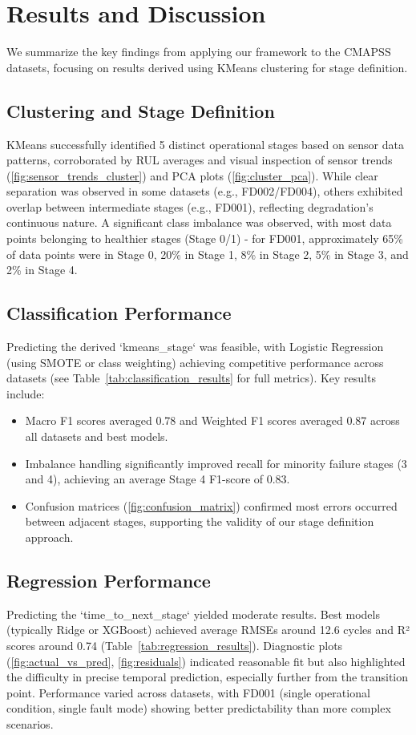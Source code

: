\section{Results and Discussion}
\label{sec:results}
We summarize the key findings from applying our framework to the CMAPSS datasets, focusing on results derived using KMeans clustering for stage definition.

\subsection{Clustering and Stage Definition}
KMeans successfully identified 5 distinct operational stages based on sensor data patterns, corroborated by RUL averages and visual inspection of sensor trends (\cref{fig:sensor_trends_cluster}) and PCA plots (\cref{fig:cluster_pca}). While clear separation was observed in some datasets (e.g., FD002/FD004), others exhibited overlap between intermediate stages (e.g., FD001), reflecting degradation's continuous nature. A significant class imbalance was observed, with most data points belonging to healthier stages (Stage 0/1) - for FD001, approximately 65\% of data points were in Stage 0, 20\% in Stage 1, 8\% in Stage 2, 5\% in Stage 3, and 2\% in Stage 4.

\subsection{Classification Performance}
Predicting the derived `kmeans\_stage` was feasible, with Logistic Regression (using SMOTE or class weighting) achieving competitive performance across datasets (see Table~\ref{tab:classification_results} for full metrics). Key results include:
\begin{itemize}
	\item Macro F1 scores averaged 0.78 and Weighted F1 scores averaged 0.87 across all datasets and best models.
	\item Imbalance handling significantly improved recall for minority failure stages (3 and 4), achieving an average Stage 4 F1-score of 0.83.
	\item Confusion matrices (\cref{fig:confusion_matrix}) confirmed most errors occurred between adjacent stages, supporting the validity of our stage definition approach.
\end{itemize}

\subsection{Regression Performance}
Predicting the `time\_to\_next\_stage` yielded moderate results. Best models (typically Ridge or XGBoost) achieved average RMSEs around 12.6 cycles and R² scores around 0.74 (Table~\ref{tab:regression_results}). Diagnostic plots (\cref{fig:actual_vs_pred}, \cref{fig:residuals}) indicated reasonable fit but also highlighted the difficulty in precise temporal prediction, especially further from the transition point. Performance varied across datasets, with FD001 (single operational condition, single fault mode) showing better predictability than more complex scenarios.

